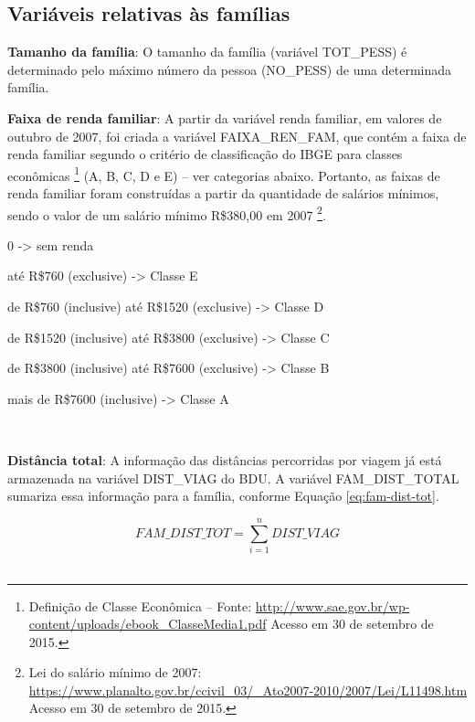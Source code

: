 \subsection{Variáveis relativas às famílias}\label{subsec:novas-var-fam}

\begin{compactitem}

\item \textbf{Tamanho da família}: O tamanho da família (variável TOT_PESS) é determinado pelo máximo número da pessoa (NO_PESS) de uma determinada família.\\

\item \textbf{Faixa de renda familiar}: A partir da variável renda familiar, em valores de outubro de 2007, foi criada a variável FAIXA_REN_FAM, que contém a faixa de renda familiar segundo o critério de classificação do IBGE para classes econômicas
\footnote{Definição de Classe Econômica – Fonte: \url{http://www.sae.gov.br/wp-content/uploads/ebook_ClasseMedia1.pdf} Acesso em 30 de setembro de 2015.} (A, B, C, D e E) – ver categorias abaixo. Portanto, as faixas de renda familiar foram construídas a partir da quantidade de salários mínimos, sendo o valor de um salário mínimo R\$380,00 em 2007
\footnote{Lei do salário mínimo de 2007: \url{ https://www.planalto.gov.br/ccivil_03/_Ato2007-2010/2007/Lei/L11498.htm} Acesso em 30 de setembro de 2015.}.
    \begin{compactitem}[]
    \item 0 -> sem renda
    \item até R\$760 (exclusive) -> Classe E
    \item de R\$760 (inclusive) até R\$1520 (exclusive) -> Classe D
    \item de R\$1520 (inclusive) até R\$3800 (exclusive) -> Classe C
    \item de R\$3800 (inclusive) até R\$7600 (exclusive) -> Classe B
    \item mais de R\$7600 (inclusive) -> Classe A
    \end{compactitem}\
    
\item \textbf{Distância total}:  A informação das distâncias percorridas por viagem já está armazenada na variável DIST_VIAG do BDU. A variável FAM_DIST_TOTAL sumariza essa informação para a família, conforme Equação \eqref{eq:fam-dist-tot}.

\begin{equation}\label{eq:fam-dist-tot}
FAM\_DIST\_TOT=\displaystyle\sum_{i=1}^{n}DIST\_VIAG
\end{equation}\\


\end{compactitem}
